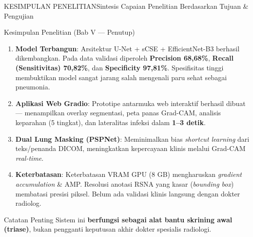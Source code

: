 \documentclass[aspectratio=169,11pt]{beamer}
\begin{document}
\begin{frame}{KESIMPULAN PENELITIAN}{Sintesis Capaian Penelitian Berdasarkan Tujuan \& Pengujian}
\begin{block}{\footnotesize Kesimpulan Penelitian (Bab V --- Penutup)}
  \begin{enumerate}\scriptsize
    \item \textbf{Model Terbangun}: Arsitektur U-Net + sCSE + EfficientNet-B3 berhasil dikembangkan. Pada data validasi diperoleh \textbf{Precision 68,68\%}, \textbf{Recall (Sensitivitas) 70,82\%}, dan \textbf{Specificity 97,81\%}. Spesifisitas tinggi membuktikan model sangat jarang salah mengenali paru sehat sebagai pneumonia.
    \item \textbf{Aplikasi Web Gradio}: Prototipe antarmuka web interaktif berhasil dibuat --- menampilkan overlay segmentasi, peta panas Grad-CAM, analisis keparahan (5 tingkat), dan lateralitas infeksi dalam \textbf{1--3 detik}.
    \item \textbf{Dual Lung Masking (PSPNet)}: Meminimalkan bias \textit{shortcut learning} dari teks/penanda DICOM, meningkatkan kepercayaan klinis melalui Grad-CAM \textit{real-time}.
    \item \textbf{Keterbatasan}: Keterbatasan VRAM GPU (8 GB) mengharuskan \textit{gradient accumulation} \& AMP. Resolusi anotasi RSNA yang kasar (\textit{bounding box}) membatasi presisi piksel. Belum ada validasi klinis langsung dengan dokter radiolog.
  \end{enumerate}
\end{block}
\vspace{0.05cm}
\begin{alertblock}{\footnotesize Catatan Penting}
  \scriptsize Sistem ini \textbf{berfungsi sebagai alat bantu skrining awal (triase)}, bukan pengganti keputusan akhir dokter spesialis radiologi.
\end{alertblock}
\end{frame}
\end{document}
